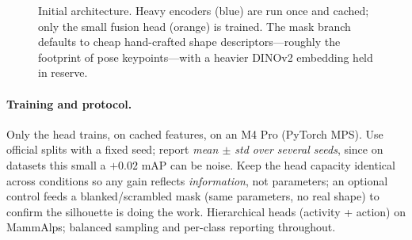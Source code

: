 \documentclass[11pt]{article}
\begin{document}
\begin{figure}[t]
\caption{Initial architecture. Heavy encoders (blue) are run once and cached; only the small fusion head (orange) is trained. The mask branch defaults to cheap hand-crafted shape descriptors---roughly the footprint of pose keypoints---with a heavier DINOv2 embedding held in reserve.}
\label{fig:arch}
\end{figure}

\paragraph{Training and protocol.} Only the head trains, on cached features, on an M4 Pro (PyTorch MPS). Use official splits with a fixed seed; report \emph{mean $\pm$ std over several seeds}, since on datasets this small a $+0.02$ mAP can be noise. Keep the head capacity identical across conditions so any gain reflects \emph{information}, not parameters; an optional control feeds a blanked/scrambled mask (same parameters, no real shape) to confirm the silhouette is doing the work. Hierarchical heads (activity + action) on MammAlps; balanced sampling and per-class reporting throughout.

\end{document}
